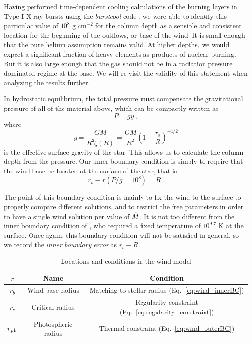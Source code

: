\documentclass[../main.tex]{subfiles}
\begin{document}
Having performed time-dependent cooling calculations of the burning layers in Type I X-ray bursts using the \textit{burstcool} code \citep{Cumming2004,Cumming2006}, we were able to identify this particular value of $10^8$ g cm$^{-2}$ for the column depth as a sensible and consistent location for the beginning of the outflows, or base of the wind. It is small enough that the pure helium assumption remains valid. At higher depths, we would expect a significant fraction of heavy elements as products of nuclear burning. But it is also large enough that the gas should not be in a radiation pressure dominated regime at the base. We will re-visit the validity of this statement when analyzing the results further.  

In hydrostatic equilibrium, the total pressure must compensate the gravitational pressure of all of the material above, which can be compactly written as
\begin{equation}
    P=gy\,,
\end{equation}
where
\begin{equation}\label{eq:g}
    g=\frac{GM}{R^2\zeta(R)}=\frac{GM}{R^2}\left(1-\frac{r_s}{R}\right)^{-1/2}
\end{equation}
is the effective surface gravity of the star. This allows us to calculate the column depth from the pressure. Our inner boundary condition is simply to require that the wind base be located at the surface of the star, that is
\begin{equation}\label{eq:wind_innerBC}
    r_b\equiv r(P/g=10^8) = R \,.
\end{equation}

The point of this boundary condition is mainly to fix the wind to the surface to properly compare different solutions, and to restrict the free parameters in order to have a single wind solution per value of $\dot{M}$. It is not too different from the inner boundary condition of \citet{Paczynski1986b}, who required a fixed temperature of $10^{9.7}$ K at the surface. Once again, this boundary condition will not be satisfied in general, so we record the \textit{inner boundary error} as $r_b-R$.

\begin{table}[h]
    \centering
    \caption{Locations and conditions in the wind model}
    \begin{tabular}{c|c|c}
        $r$ & Name & Condition   \\\hline
        $r_b$ & Wind base radius & Matching to stellar radius (Eq.~\ref{eq:wind_innerBC})\\
        $r_c$ & Critical radius & Regularity constraint (Eq.~\ref{eq:regularity_constraint}) \\
        $r_\text{ph}$ & Photospheric radius & Thermal constraint (Eq.~\ref{eq:wind_outerBC})
    \end{tabular}
    \label{tab:wind_locations}
\end{table}
\end{document}
